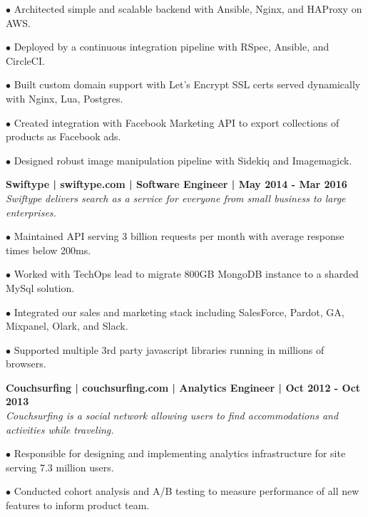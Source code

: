 \documentclass{article}
\begin{document}
\begin{description}
	 \item$\bullet$ Architected simple and scalable backend with Ansible, Nginx, and HAProxy on AWS.
	 \item$\bullet$ Deployed by a continuous integration pipeline with RSpec, Ansible, and CircleCI.
	 \item$\bullet$ Built custom domain support with Let’s Encrypt SSL certs served dynamically with Nginx, Lua, Postgres.
	 \item$\bullet$ Created integration with Facebook Marketing API to export collections of products as Facebook ads.
	 \item$\bullet$ Designed robust image manipulation pipeline with Sidekiq and Imagemagick.
	
	 \item \textbf{Swiftype | swiftype.com | Software Engineer | May 2014 - Mar 2016} \\
	 \textit{Swiftype delivers search as a service for everyone from small business to large enterprises.}
	 
	 \item$\bullet$ Maintained API serving 3 billion requests per month with average response times below 200ms.
	 \item$\bullet$ Worked with TechOps lead to migrate 800GB MongoDB instance to a sharded MySql solution.
	 \item$\bullet$ Integrated our sales and marketing stack including SalesForce, Pardot, GA, Mixpanel, Olark, and Slack.
	 \item$\bullet$ Supported multiple 3rd party javascript libraries running in millions of browsers.
	 	
	 \item \textbf{Couchsurfing | couchsurfing.com | Analytics Engineer | Oct 2012 - Oct 2013} \\
	  \textit{Couchsurfing is a social network allowing users to find accommodations and activities while traveling.}
	 \item$\bullet$ Responsible for designing and implementing analytics infrastructure for site serving 7.3 million users.
	 \item$\bullet$ Conducted cohort analysis and A/B testing to measure performance of all new features to inform product team.
	 
	 
	\end{description}
\end{document}
